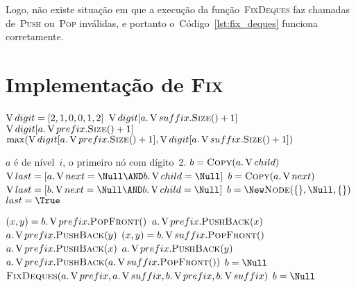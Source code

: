 \documentclass[main.tex]{subfiles}
\begin{document}
Logo, não existe situação em que a execução da função~\textsc{FixDeques} faz chamadas de~\textsc{Push} ou~\textsc{Pop} inválidas, e portanto o~Código~\ref{lst:fix_deques} funciona corretamente.

\section{Implementação de {\normalfont \textsc{Fix}}}

\begin{algorithm}
\begin{algorithmic}[1]

    \State $\operatorname{V}{digit} = [2, 1, 0, 0, 1, 2]$ 
        \State \Return $\V{digit}[a.\V{suffix}.\Call{Size}{\null} + 1]$
        \State \Return $\V{digit}[a.\V{prefix}.\Call{Size}{\null} + 1]$
    \Else
        \State \Return $\max(\V{digit}[a.\V{prefix}.\Call{Size}{\null} + 1], \V{digit}[a.\V{suffix}.\Call{Size}{\null} + 1])$
    \EndIf
\EndFunction

\Require $a$ é de nível~$i$, o primeiro nó com dígito~2.
     \label{line:fix:p1b}
        \State $b = \Call{Copy}{a.\V{child}}$
        \State $\V{last} = [a.\V{next} = \Null \AND b.\V{child} = \Null]$
        \State $b = \Call{Copy}{a.\V{next}}$
        \State $\V{last} = [b.\V{next} = \Null \AND b.\V{child} = \Null]$
    \Else
        \State $b = \New \Call{Node}{\{\}, \Null, \{\}}$  \label{line:fix:p1e}
        \State $last = \True$
    \EndIf

       \label{line:fix:p2b}
            \State $(x, y) = b.\V{prefix}.\Call{PopFront}{\null}$
            \State $a.\operatorname{V}{prefix}.\textsc{PushBack}(x)$
            \State $a.\operatorname{V}{prefix}.\textsc{PushBack}(y)$
        \EndIf
            \State $(x, y) = b.\V{suffix}.\Call{PopFront}{\null}$
            \State $a.\operatorname{V}{prefix}.\textsc{PushBack}(x)$
            \State $a.\operatorname{V}{prefix}.\textsc{PushBack}(y)$
        \EndIf
            \State $a.\V{prefix}.\textsc{PushBack}(a.\V{suffix}.\Call{PopFront}{\null})$
        \EndIf
        \State $b = \Null$  \label{line:fix:p2e}
    \Else {}  \label{line:fix:p3b}
        \State $\Call{FixDeques}{a.\V{prefix}, a.\V{suffix}, b.\V{prefix}, b.\V{suffix}}$
         \label{line:fix:if_empty}
            \State $b = \Null$  \label{line:fix:p3e}
        \EndIf
    \EndIf


\end{algorithmic}
\end{algorithm}
\end{document}
